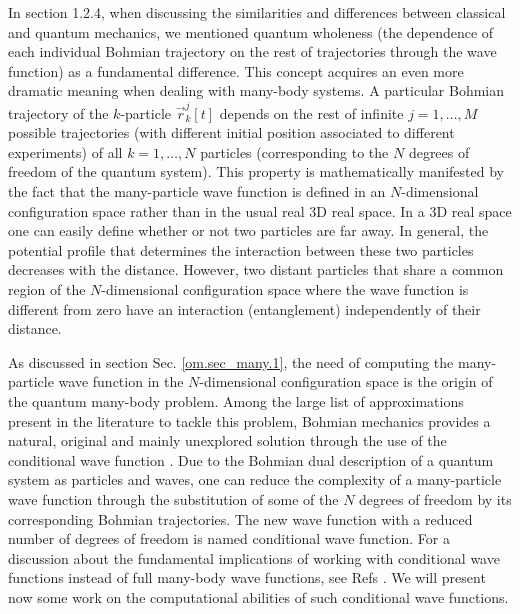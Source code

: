\documentclass[nofootinbib, secnumarabic, amsmath, nobibnotes,10pt,aps,pra]{revtex4-1}
\newcommand{\sref}[1]{Sec. \ref{#1}}
\begin{document}
In section 1.2.4, when discussing the similarities and differences
between classical and quantum mechanics, we mentioned quantum
wholeness (the dependence of each individual Bohmian trajectory on
the rest of trajectories through the wave function) as a fundamental
difference. This concept acquires an even more dramatic meaning when
dealing with many-body systems. A particular Bohmian trajectory of
the $k$-particle $\vec r_k^j[t]$ depends on the rest of infinite $j = 1, \ldots, M$ possible
trajectories (with different initial position associated to different experiments) of all $k = 1,\ldots, N$
particles (corresponding to the $N$ degrees of freedom of the quantum system). This property is mathematically manifested by the fact
that the many-particle wave function is defined in an $N$-dimensional
configuration space rather than in the usual real 3D real space. In a 3D
real space one can easily define whether or not two particles are
far away. In general, the potential profile that determines the
interaction between these two particles decreases with the distance.
However, two distant particles that share a common region of the
$N$-dimensional configuration space where the wave function is
different from zero have an interaction (entanglement) independently
of their distance.

As discussed in section \sref{om.sec_many.1}, the need of computing the
many-particle wave function in the $N$-dimensional configuration
space is the origin of the quantum many-body problem. Among the
large list of approximations present in the literature to tackle
this problem, Bohmian mechanics provides a natural, original and
mainly unexplored solution through the use of the conditional wave
function \cite{om.norsen}. Due to the Bohmian dual description of a quantum
system as particles and waves, one can reduce the complexity of a
many-particle wave function through the substitution of  some of the
$N$ degrees of freedom by its corresponding Bohmian trajectories.
The new wave function with a reduced number of degrees of freedom is
named conditional wave function.  For a discussion about the
fundamental implications of working with conditional wave functions
instead of full many-body wave functions, see Refs \cite{om.norsen,om.norsen2}. We will
present now  some work on the computational abilities of such
conditional wave functions.
\end{document}
